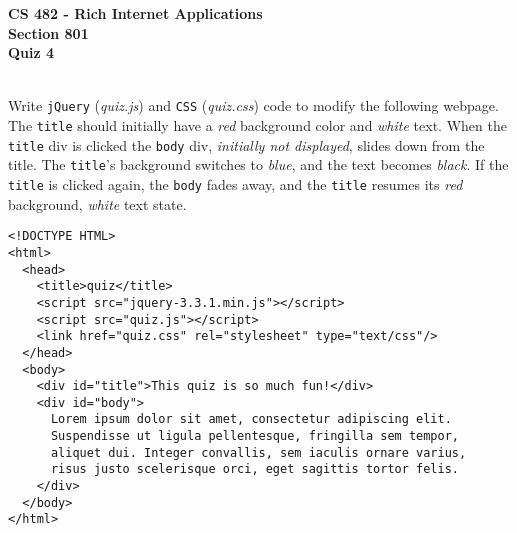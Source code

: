 \documentclass[letterpaper]{exam}
\begin{document}
\begin{center}
	\textbf{CS 482 - Rich Internet Applications} \\
	\textbf{Section 801} \\
	\textbf{Quiz 4} \\
	\vspace{5mm}
	 \\
\end{center}


\begin{questions}
	\question[10] Write \texttt{jQuery} (\emph{quiz.js}) and \texttt{CSS} (\emph{quiz.css}) code to modify the following webpage. The \texttt{title} should initially have a \emph{red} background color and \emph{white} text. When the \texttt{title} div is clicked the \texttt{body} div, \emph{initially not displayed}, slides down from the title. The \texttt{title}'s background switches to \emph{blue}, and the text becomes \emph{black}. If the \texttt{title} is clicked again, the \texttt{body} fades away, and the \texttt{title} resumes its \emph{red} background, \emph{white} text state.
	
	
	\begin{lstlisting}
<!DOCTYPE HTML>
<html>
  <head>
    <title>quiz</title>
    <script src="jquery-3.3.1.min.js"></script>
    <script src="quiz.js"></script>
    <link href="quiz.css" rel="stylesheet" type="text/css"/>
  </head>
  <body>
    <div id="title">This quiz is so much fun!</div>
    <div id="body">
	  Lorem ipsum dolor sit amet, consectetur adipiscing elit. 
	  Suspendisse ut ligula pellentesque, fringilla sem tempor, 
	  aliquet dui. Integer convallis, sem iaculis ornare varius, 
	  risus justo scelerisque orci, eget sagittis tortor felis. 
	</div>
  </body>
</html>
	\end{lstlisting}
		
\end{questions}
\end{document}
